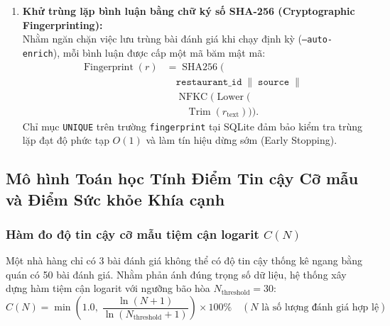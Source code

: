 \documentclass[12pt, a4paper]{article}
\begin{document}
\begin{enumerate}[leftmargin=1.0cm, label=\textbf{Bước \arabic*:}, itemsep=5pt]
    \item \textbf{Khử trùng lặp bình luận bằng chữ ký số SHA-256 (Cryptographic Fingerprinting):}\\
    Nhằm ngăn chặn việc lưu trùng bài đánh giá khi chạy định kỳ (\texttt{--auto-enrich}), mỗi bình luận được cấp một mã băm mật mã:
    \begin{equation}
    \begin{aligned}
        \operatorname{Fingerprint}(r) &= \operatorname{SHA256}\Big(\\
        &\quad \texttt{restaurant\_id}\;\|\;\texttt{source}\;\|\;\\
        &\quad \operatorname{NFKC}\big(\operatorname{Lower}(\\
        &\qquad \operatorname{Trim}(r_{\text{text}})\big)\Big).
    \end{aligned}
    \end{equation}
    Chỉ mục \texttt{UNIQUE} trên trường \texttt{fingerprint} tại SQLite đảm bảo kiểm tra trùng lặp đạt độ phức tạp $O(1)$ và làm tín hiệu dừng sớm (Early Stopping).
\end{enumerate}

\subsection{Mô hình Toán học Tính Điểm Tin cậy Cỡ mẫu và Điểm Sức khỏe Khía cạnh}

\subsubsection{Hàm đo độ tin cậy cỡ mẫu tiệm cận logarit $C(N)$}
Một nhà hàng chỉ có 3 bài đánh giá không thể có độ tin cậy thống kê ngang bằng quán có 50 bài đánh giá. Nhằm phản ánh đúng trọng số dữ liệu, hệ thống xây dựng hàm tiệm cận logarit với ngưỡng bão hòa $N_{\text{threshold}} = 30$:
\begin{equation}
    C(N) = \min\left( 1.0,\; \frac{\ln(N + 1)}{\ln(N_{\text{threshold}} + 1)} \right) \times 100\% \quad (N \text{ là số lượng đánh giá hợp lệ})
\end{equation}
\end{document}
